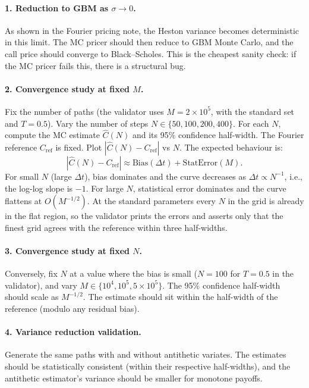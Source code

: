 \documentclass[11pt]{article}
\theoremstyle{plain}
\theoremstyle{definition}
\theoremstyle{remark}
\begin{document}
\paragraph{1. Reduction to GBM as $\sigma \to 0$.} As shown in the Fourier pricing note, the Heston variance becomes deterministic in this limit. The MC pricer should then reduce to GBM Monte Carlo, and the call price should converge to Black--Scholes. This is the cheapest sanity check: if the MC pricer fails this, there is a structural bug.

\paragraph{2. Convergence study at fixed $M$.} Fix the number of paths (the validator uses $M = 2 \times 10^5$, with the standard set and $T = 0.5$). Vary the number of steps $N \in \{50, 100, 200, 400\}$. For each $N$, compute the MC estimate $\widehat C(N)$ and its 95\% confidence half-width. The Fourier reference $C_{\mathrm{ref}}$ is fixed. Plot $|\widehat C(N) - C_{\mathrm{ref}}|$ vs $N$. The expected behaviour is:
\[
    |\widehat C(N) - C_{\mathrm{ref}}| \approx \mathrm{Bias}(\Delta t) + \mathrm{StatError}(M).
\]
For small $N$ (large $\Delta t$), bias dominates and the curve decreases as $\Delta t \propto N^{-1}$, i.e., the log-log slope is $-1$. For large $N$, statistical error dominates and the curve flattens at $O(M^{-1/2})$. At the standard parameters every $N$ in the grid is already in the flat region, so the validator prints the errors and asserts only that the finest grid agrees with the reference within three half-widths.

\paragraph{3. Convergence study at fixed $N$.} Conversely, fix $N$ at a value where the bias is small ($N = 100$ for $T = 0.5$ in the validator), and vary $M \in \{10^4, 10^5, 5 \times 10^5\}$. The 95\% confidence half-width should scale as $M^{-1/2}$. The estimate should sit within the half-width of the reference (modulo any residual bias).

\paragraph{4. Variance reduction validation.} Generate the same paths with and without antithetic variates. The estimates should be statistically consistent (within their respective half-widths), and the antithetic estimator's variance should be smaller for monotone payoffs.
\end{document}
